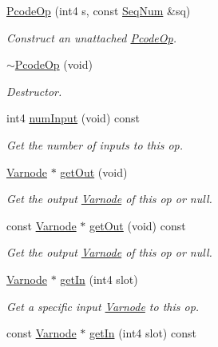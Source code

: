 \begin{DoxyCompactItemize}
\item 
\mbox{\hyperlink{class_pcode_op_af0d30dfcb1e58033fd3b25cebfcfffa5}{Pcode\+Op}} (int4 s, const \mbox{\hyperlink{class_seq_num}{Seq\+Num}} \&sq)
\begin{DoxyCompactList}\small\item\em Construct an unattached \mbox{\hyperlink{class_pcode_op}{Pcode\+Op}}. \end{DoxyCompactList}\item 
\mbox{\hyperlink{class_pcode_op_a9c4e5b2b819c19196421903f27e7fbe8}{$\sim$\+Pcode\+Op}} (void)
\begin{DoxyCompactList}\small\item\em Destructor. \end{DoxyCompactList}\item 
int4 \mbox{\hyperlink{class_pcode_op_a71129a0986d769b189aec8ea80046fbd}{num\+Input}} (void) const
\begin{DoxyCompactList}\small\item\em Get the number of inputs to this op. \end{DoxyCompactList}\item 
\mbox{\hyperlink{class_varnode}{Varnode}} $\ast$ \mbox{\hyperlink{class_pcode_op_a71498bcea3f59f0eb5878e56536d68c3}{get\+Out}} (void)
\begin{DoxyCompactList}\small\item\em Get the output \mbox{\hyperlink{class_varnode}{Varnode}} of this op or {\itshape null}. \end{DoxyCompactList}\item 
const \mbox{\hyperlink{class_varnode}{Varnode}} $\ast$ \mbox{\hyperlink{class_pcode_op_a9a19bc5173dd16de72f4667f7c49571c}{get\+Out}} (void) const
\begin{DoxyCompactList}\small\item\em Get the output \mbox{\hyperlink{class_varnode}{Varnode}} of this op or {\itshape null}. \end{DoxyCompactList}\item 
\mbox{\hyperlink{class_varnode}{Varnode}} $\ast$ \mbox{\hyperlink{class_pcode_op_a346b81187c4eab2f5e0ced8b455c1531}{get\+In}} (int4 slot)
\begin{DoxyCompactList}\small\item\em Get a specific input \mbox{\hyperlink{class_varnode}{Varnode}} to this op. \end{DoxyCompactList}\item 
const \mbox{\hyperlink{class_varnode}{Varnode}} $\ast$ \mbox{\hyperlink{class_pcode_op_a927a386f470a9ab28cccf8c375ca3810}{get\+In}} (int4 slot) const

\end{DoxyCompactItemize}
